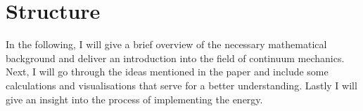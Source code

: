 \section{Structure}
In the following, I will give a brief overview of the necessary mathematical background and deliver an introduction into the field of continuum mechanics. Next, I will go through the ideas mentioned in the paper and include some calculations and visualisations that serve for a better understanding. Lastly I will give an insight into the process of implementing the energy. \\


